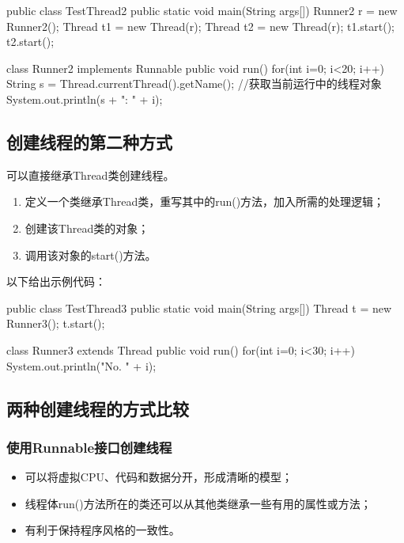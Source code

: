 
\begin{javaCode}
public class TestThread2 {
  public static void main(String args[]) {
    Runner2 r = new Runner2();
    Thread t1 = new Thread(r);
    Thread t2 = new Thread(r);
    t1.start();
    t2.start();
  }
}

class Runner2 implements Runnable {
  public void run() {
    for(int i=0; i<20; i++) {
      String s = Thread.currentThread().getName(); //获取当前运行中的线程对象
      System.out.println(s + ": " + i);
    }
  }
}
\end{javaCode}

\subsection{创建线程的第二种方式}

可以直接继承Thread类创建线程。

\begin{enumerate}
\item 定义一个类继承Thread类，重写其中的run()方法，加入所需的处理逻辑；
\item 创建该Thread类的对象；
\item 调用该对象的start()方法。
\end{enumerate}

以下给出示例代码：


\begin{javaCode}
public class TestThread3 {
  public static void main(String args[]) {
    Thread t = new Runner3();
    t.start();
  }
}

class Runner3 extends Thread {
  public void run() {
    for(int i=0; i<30; i++) {
      System.out.println("No. " + i);
    }
  }
}
\end{javaCode}


\subsection{两种创建线程的方式比较}

\subsubsection{使用Runnable接口创建线程}

\begin{itemize}
\item 可以将虚拟CPU、代码和数据分开，形成清晰的模型；
\item 线程体run()方法所在的类还可以从其他类继承一些有用的属性或方法；
\item 有利于保持程序风格的一致性。
\end{itemize}

